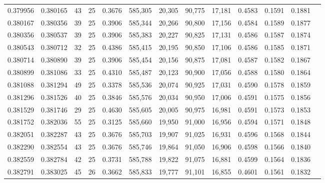 \begin{tabular}{rrrrrrrrrrrrr}
0.379956 & 0.380165 &    43 &  25 &                                     0.3676 & 585,305 &  20,305 &  90,775 &  17,181 & 0.4583 & 0.1591 & 0.1881 \\
0.380167 & 0.380356 &    39 &  25 &                                     0.3906 & 585,344 &  20,266 &  90,800 &  17,156 & 0.4584 & 0.1589 & 0.1877 \\
0.380356 & 0.380537 &    39 &  25 &                                     0.3906 & 585,383 &  20,227 &  90,825 &  17,131 & 0.4586 & 0.1587 & 0.1874 \\
0.380543 & 0.380712 &    32 &  25 &                                     0.4386 & 585,415 &  20,195 &  90,850 &  17,106 & 0.4586 & 0.1585 & 0.1871 \\
0.380714 & 0.380890 &    39 &  25 &                                     0.3906 & 585,454 &  20,156 &  90,875 &  17,081 & 0.4587 & 0.1582 & 0.1867 \\
0.380899 & 0.381086 &    33 &  25 &                                     0.4310 & 585,487 &  20,123 &  90,900 &  17,056 & 0.4588 & 0.1580 & 0.1864 \\
0.381088 & 0.381294 &    49 &  25 &                                     0.3378 & 585,536 &  20,074 &  90,925 &  17,031 & 0.4590 & 0.1578 & 0.1859 \\
0.381296 & 0.381526 &    40 &  25 &                                     0.3846 & 585,576 &  20,034 &  90,950 &  17,006 & 0.4591 & 0.1575 & 0.1856 \\
0.381529 & 0.381746 &    29 &  25 &                                     0.4630 & 585,605 &  20,005 &  90,975 &  16,981 & 0.4591 & 0.1573 & 0.1853 \\
0.381752 & 0.382036 &    55 &  25 &                                     0.3125 & 585,660 &  19,950 &  91,000 &  16,956 & 0.4594 & 0.1571 & 0.1848 \\
0.382051 & 0.382287 &    43 &  25 &                                     0.3676 & 585,703 &  19,907 &  91,025 &  16,931 & 0.4596 & 0.1568 & 0.1844 \\
0.382290 & 0.382554 &    43 &  25 &                                     0.3676 & 585,746 &  19,864 &  91,050 &  16,906 & 0.4598 & 0.1566 & 0.1840 \\
0.382559 & 0.382784 &    42 &  25 &                                     0.3731 & 585,788 &  19,822 &  91,075 &  16,881 & 0.4599 & 0.1564 & 0.1836 \\
0.382791 & 0.383025 &    45 &  26 &                                     0.3662 & 585,833 &  19,777 &  91,101 &  16,855 & 0.4601 & 0.1561 & 0.1832 \\

\end{tabular}
